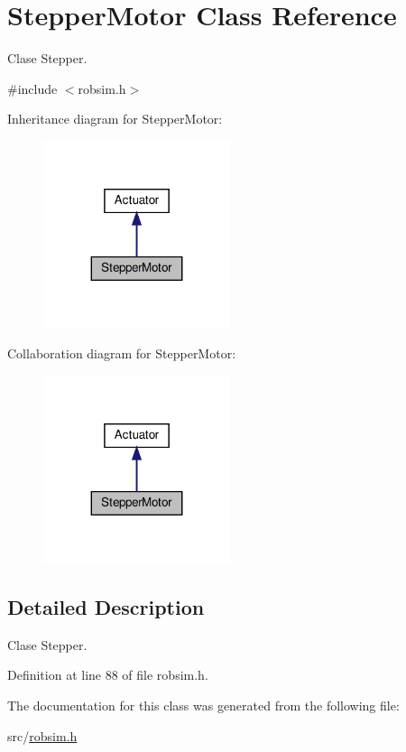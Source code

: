 \hypertarget{classStepperMotor}{}\section{Stepper\+Motor Class Reference}
\label{classStepperMotor}


Clase Stepper.  




{\ttfamily \#include $<$robsim.\+h$>$}



Inheritance diagram for Stepper\+Motor\+:\nopagebreak
\begin{figure}[H]
\begin{center}
\leavevmode
\includegraphics[width=155pt]{classStepperMotor__inherit__graph}
\end{center}
\end{figure}


Collaboration diagram for Stepper\+Motor\+:\nopagebreak
\begin{figure}[H]
\begin{center}
\leavevmode
\includegraphics[width=155pt]{classStepperMotor__coll__graph}
\end{center}
\end{figure}


\subsection{Detailed Description}
Clase Stepper. 

Definition at line 88 of file robsim.\+h.



The documentation for this class was generated from the following file\+:\begin{DoxyCompactItemize}
\item 
src/\hyperlink{robsim_8h}{robsim.\+h}\end{DoxyCompactItemize}
